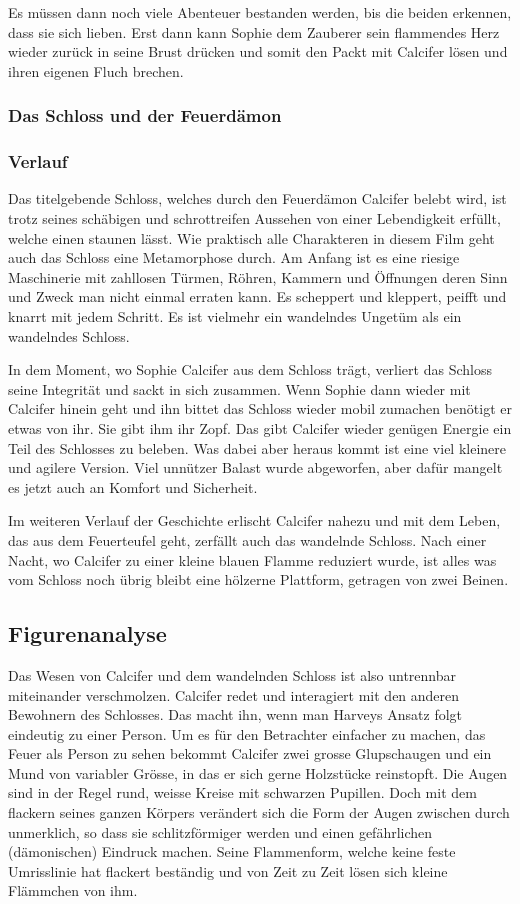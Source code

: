 Es müssen dann noch viele Abenteuer bestanden werden, bis die beiden erkennen, dass sie sich lieben. Erst dann kann Sophie dem Zauberer sein flammendes Herz wieder zurück in seine Brust drücken und somit den Packt mit Calcifer lösen und ihren eigenen Fluch brechen. 

\subsubsection{Das Schloss und der Feuerdämon}
\subsubsection*{Verlauf}
Das titelgebende Schloss, welches durch den Feuerdämon Calcifer belebt wird, ist trotz seines schäbigen und schrottreifen Aussehen von einer Lebendigkeit erfüllt, welche einen staunen lässt. Wie praktisch alle Charakteren in diesem Film geht auch das Schloss eine Metamorphose durch. Am Anfang ist es eine riesige Maschinerie mit zahllosen Türmen, Röhren, Kammern und Öffnungen deren Sinn und Zweck man nicht einmal erraten kann. Es scheppert und kleppert, peifft und knarrt mit jedem Schritt. Es ist vielmehr ein wandelndes Ungetüm als ein wandelndes Schloss.

In dem Moment, wo Sophie Calcifer aus dem Schloss trägt, verliert das Schloss seine Integrität und sackt in sich zusammen. Wenn Sophie dann wieder mit Calcifer hinein geht und ihn bittet das Schloss wieder mobil zumachen benötigt er etwas von ihr. Sie gibt ihm ihr Zopf. Das gibt Calcifer wieder genügen Energie ein Teil des Schlosses zu beleben. Was dabei aber heraus kommt ist eine viel kleinere und agilere Version. Viel unnützer Balast wurde abgeworfen, aber dafür mangelt es jetzt auch an Komfort und Sicherheit. 

Im weiteren Verlauf der Geschichte erlischt Calcifer nahezu und mit dem Leben, das aus dem Feuerteufel geht, zerfällt auch das wandelnde Schloss. Nach einer Nacht, wo Calcifer zu einer kleine blauen Flamme reduziert wurde, ist alles was vom Schloss noch übrig bleibt eine hölzerne Plattform, getragen von zwei Beinen. 

\subsection*{Figurenanalyse}
Das Wesen von Calcifer und dem wandelnden Schloss ist also untrennbar miteinander verschmolzen. Calcifer redet und interagiert mit den anderen Bewohnern des Schlosses. Das macht ihn, wenn man Harveys Ansatz folgt eindeutig zu einer Person. Um es für den Betrachter einfacher zu machen, das Feuer als Person zu sehen bekommt Calcifer zwei grosse Glupschaugen und ein Mund von variabler Grösse, in das er sich gerne Holzstücke reinstopft. Die Augen sind in der Regel rund, weisse Kreise mit schwarzen Pupillen. Doch mit dem flackern seines ganzen Körpers verändert sich die Form der Augen zwischen durch unmerklich, so dass sie schlitzförmiger werden und einen gefährlichen (dämonischen) Eindruck machen. Seine Flammenform, welche keine feste Umrisslinie hat flackert beständig und von Zeit zu Zeit lösen sich kleine Flämmchen von ihm. 

